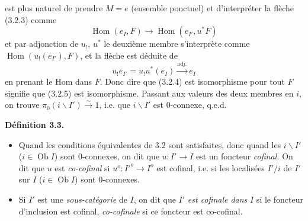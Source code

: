 \documentclass[11pt]{article}
\newcommand{\printedpage}[1]{\marginpar{\footnotesize p.~#1}}
\newcommand{\msp}[1]{\marginpar{\footnotesize [#1]}}
\newcommand{\Hom}{\operatorname{Hom}}
\newcommand{\Ob}{\operatorname{Ob}}
\newcommand{\bs}{\backslash}
\begin{document}
\printedpage{29}

\msp{page 45}
est plus naturel de prendre $M = e$ (ensemble ponctuel) et d'interpréter la flèche (3.2.3) comme
\[
\Hom(e_I, F) \longrightarrow \Hom(e_{I'}, u^*F)
\tag*{(3.2.4)}
\]
et par adjonction de $u_!$, $u^*$ le deuxième membre s'interprète comme $\Hom(u_!(e_{I'}), F)$, et la flèche est déduite de
\[
u_!e_{I'} = u_!u^*(e_I) \xrightarrow{\text{adj.}} e_I
\tag*{(3.2.5)}
\]
en prenant le Hom dans $F$. Donc dire que (3.2.4) est isomorphisme pour tout $F$ signifie que (3.2.5) est isomorphisme. Passant aux valeurs des deux membres en $i$, on trouve $\pi_0(i\bs I') \xrightarrow{\sim} 1$, i.e. que $i\bs I'$ est 0-connexe, q.e.d.

\noindent\textbf{Définition 3.3.}
\begin{itemize}[label={}]
\item[a)] Quand les conditions équivalentes de 3.2 sont satisfaites, donc quand les $i\bs I'$ ($i \in \Ob I$) sont 0-connexes, on dit que $u : I' \longrightarrow I$ est un foncteur \textit{cofinal.} On dit que $u$ est \textit{co-cofinal} si $u^o : I'^o \longrightarrow I^o$ est cofinal, i.e. si les localisées $I'/i$ de $I'$ sur $I$ ($i \in \Ob I$) sont 0-connexes.
\item[b)] Si $I'$ est une \textit{sous-catégorie} de $I$, on dit que $I'$ \textit{est cofinale dans} $I$ si le foncteur d'inclusion est cofinal, \textit{co-cofinale} si ce foncteur est co-cofinal.
\end{itemize}
\end{document}
